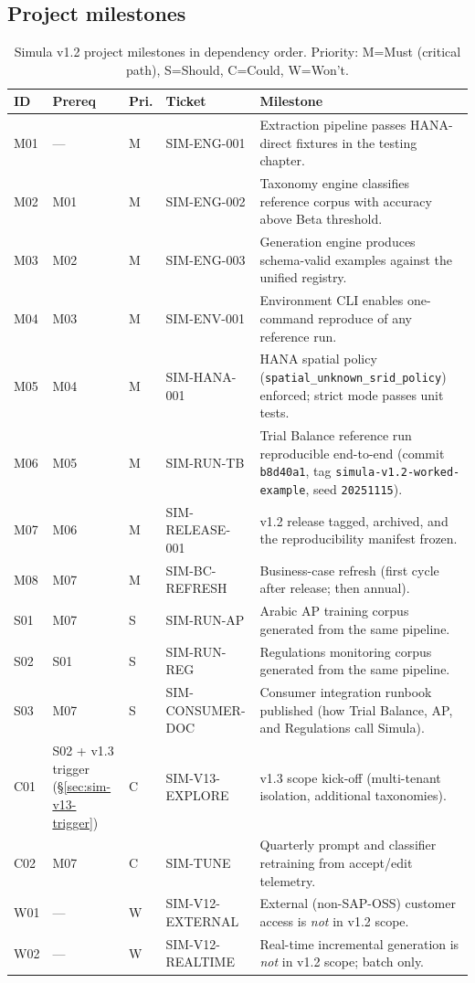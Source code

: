\subsection{Project milestones}\label{sec:sim-milestones}

\begin{table}[htbp]
\centering
\caption{Simula v1.2 project milestones in dependency order.
Priority: M=Must (critical path), S=Should, C=Could, W=Won't.}
\label{tab:sim-milestones}
\footnotesize
\begin{tabularx}{\linewidth}{@{}l l l l X@{}}
\toprule
\textbf{ID} & \textbf{Prereq} & \textbf{Pri.} & \textbf{Ticket} & \textbf{Milestone} \\ \midrule
M01 & ---      & M & SIM-ENG-001       & Extraction pipeline passes HANA-direct fixtures in the testing chapter. \\
M02 & M01      & M & SIM-ENG-002       & Taxonomy engine classifies reference corpus with accuracy above Beta threshold. \\
M03 & M02      & M & SIM-ENG-003       & Generation engine produces schema-valid examples against the unified registry. \\
M04 & M03      & M & SIM-ENV-001       & Environment CLI enables one-command reproduce of any reference run. \\
M05 & M04      & M & SIM-HANA-001      & HANA spatial policy (\texttt{spatial\_unknown\_srid\_policy}) enforced; strict mode passes unit tests. \\
M06 & M05      & M & SIM-RUN-TB        & Trial Balance reference run reproducible end-to-end (commit \texttt{b8d40a1}, tag \texttt{simula-v1.2-worked-example}, seed \texttt{20251115}). \\
M07 & M06      & M & SIM-RELEASE-001   & v1.2 release tagged, archived, and the reproducibility manifest frozen. \\
M08 & M07      & M & SIM-BC-REFRESH    & Business-case refresh (first cycle after release; then annual). \\
S01 & M07      & S & SIM-RUN-AP        & Arabic AP training corpus generated from the same pipeline. \\
S02 & S01      & S & SIM-RUN-REG       & Regulations monitoring corpus generated from the same pipeline. \\
S03 & M07      & S & SIM-CONSUMER-DOC  & Consumer integration runbook published (how Trial Balance, AP, and Regulations call Simula). \\
C01 & S02 + v1.3 trigger (\S\ref{sec:sim-v13-trigger}) & C & SIM-V13-EXPLORE & v1.3 scope kick-off (multi-tenant isolation, additional taxonomies). \\
C02 & M07      & C & SIM-TUNE          & Quarterly prompt and classifier retraining from accept/edit telemetry. \\
W01 & ---      & W & SIM-V12-EXTERNAL  & External (non-SAP-OSS) customer access is \emph{not} in v1.2 scope. \\
W02 & ---      & W & SIM-V12-REALTIME  & Real-time incremental generation is \emph{not} in v1.2 scope; batch only. \\
\bottomrule
\end{tabularx}
\end{table}

